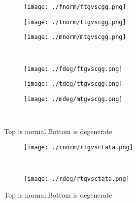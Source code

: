 \documentclass[aps,floats,floatfix,nofootinbib]{revtex4-1}
\begin{document}
\begin{center}
\begin{figure}
\begin{subfigure}{0.3\textwidth}
\texttt{[image: ./fnorm/ftgvscgg.png]}
\label{}
\end{subfigure}
\begin{subfigure}{0.3\textwidth}
\texttt{[image: ./tnorm/ttgvscgg.png]}
\label{}
\end{subfigure}
\begin{subfigure}{0.3\textwidth}
\texttt{[image: ./mnorm/mtgvscgg.png]}
\label{}
\end{subfigure}\\
\begin{subfigure}{0.3\textwidth}
\texttt{[image: ./fdeg/ftgvscgg.png]}
\label{}
\end{subfigure}
\begin{subfigure}{0.3\textwidth}
\texttt{[image: ./tdeg/ttgvscgg.png]}
\label{}
\end{subfigure}
\begin{subfigure}{0.3\textwidth}
\texttt{[image: ./mdeg/mtgvscgg.png]}
\label{}
\end{subfigure}\\
\caption{Top is normal,Bottom is degenerate}
\end{figure}
\end{center}

\begin{center}
\begin{figure}
\begin{subfigure}{0.95\textwidth}
\texttt{[image: ./rnorm/rtgvsctata.png]}
\label{}
\end{subfigure}\\
\begin{subfigure}{0.95\textwidth}
\texttt{[image: ./rdeg/rtgvsctata.png]}
\label{}
\end{subfigure}
\caption{Top is normal,Bottom is degenerate}
\end{figure}
\end{center}
\end{document}

